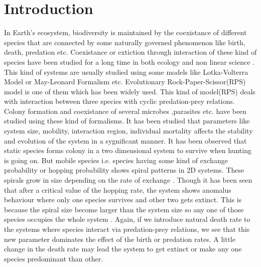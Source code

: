 \documentclass[aps, prl, twocolumn, amsmath, superscriptaddress,showkeys,showpacs]{revtex4-2}
\begin{document}
\section{Introduction}
\label{intro}
\noindent
	 In Earth's ecosystem, biodiversity is maintained by the coexistance of different species that are connected by some naturally governed phenomenon like birth, death, predation etc. Coexistance or extiction through interaction of these kind of species have been studied for a long time in both ecology \citep{tainaka2000physics}  and non linear science \citep{may1975nonlinear}. This kind of systems are usually studied using some models like Lotka-Volterra Model\citep{bacaer2011lotka} or May-Leonard Formalism \citep{chi1998asymmetric} etc. Evolutionary Rock-Paper-Scissor(RPS) model \citep{sinervo1996rock} is one of them which has been widely used\citep{arunachalam2020rock, kerr2002local, park2019fitness, reichenbach2007mobility, hashimoto2018clustering}. This kind of model(RPS) deals with interaction between three species with cyclic predation-prey relations. Colony formation and coexistance of several microbes \citep{ke2020effects, momeni2017lotka},parasites \citep{cameron2009parasite, segura2013competition} etc. have been studied using these kind of formalisms. It has been studied that parameters like system size, mobility, interaction region, individual mortality affects the stability and evolution of the system in a sygnificant manner. It has been observed that static species forms colony in a two dimensional system to survive when hunting is  going on. But mobile species i.e. species having some kind of exchange probability or hopping probability shows spiral patterns\citep{reichenbach2008self, avelino2012junctions, avelino2018directional} in 2D systems. These spirals grow in size depending on the rate of exchange . Though it has been seen that after a critical value of the hopping rate, the system shows anomalus behaviour where only one species survives and other two gets extinct. This is because the spiral size become larger than the system size so any one of those species occupies the whole system \citep{reichenbach2007mobility}. Again, if we introduce natural death rate to the systems where species interact via predation-prey relations, we see that this new parameter dominates the effect of the birth or predation rates. A little change in the death rate may lead the system to get extinct or make any one species predominant than other\citep{bhattacharyya2020mortality}.
	
\end{document}
